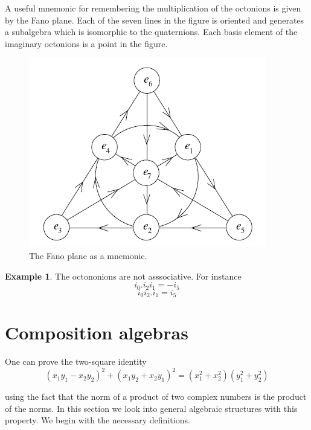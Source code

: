 \documentclass[11pt]{report}
\theoremstyle{plain}
\theoremstyle{definition}
\newtheorem{exmp}{Example} %
\begin{document}
A useful mnemonic for remembering the multiplication of the octonions is given by the Fano plane. Each of the seven lines in the figure is oriented and generates a subalgebra which is isomorphic to the quaternions. Each basis element of the imaginary octonions is a point in the figure.
\begin{figure}

\includegraphics[scale=0.6]{fano}
\centering
\caption{The Fano plane as a mnemonic.}
\end{figure}

\begin{exmp}
The octononions are not asssociative.  For instance 
$$i_0.i_2i_1 = -i_5 $$ $$i_0i_2.i_1 = i_5$$

\end{exmp}
\chapter{Composition algebras}
	One can prove the two-square identity 
	$$	(x_1y_1 - x_2y_2)^2  + (x_1y_2 + x_2y_1)^2 = (x_1 ^{2}+x_2^{2})(y_1 ^{2}+y_2 ^ {2})$$
	
	using the fact that the norm of a product of two complex numbers is the product of the norms. In this section we look into general algebraic structures with this property. We begin with the necessary definitions.
	
\end{document}

